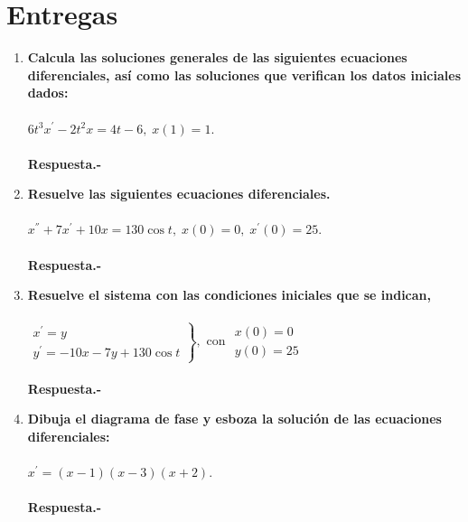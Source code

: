 \section*{\center Entregas}
\vspace{1cm}

\begin{enumerate}[\bfseries 1.]

    \item \textbf{Calcula las soluciones generales de las siguientes ecuaciones diferenciales, así como las soluciones que verifican los datos iniciales dados:}\\\\
	$6t^3x^{'}-2t^2x=4t-6,\; x(1)=1$.\\\\	
	\textbf{Respuesta.-}\; 

    \item \textbf{Resuelve las siguientes ecuaciones diferenciales.}\\\\
	$x^{''}+7x^{'}+10x=130 \cos t, \; x(0)=0,\; x^{'}(0)=25$.\\\\
	\textbf{Respuesta.-}\; 

    \item \textbf{Resuelve el sistema con las condiciones iniciales que se indican,}\\\\
	$\left.\begin{array}{l}x^{'}=y \\ y^{'}=-10x-7y+130\cos t \end{array}\right\},$ con $\begin{array}{l} x(0)=0 \\ y(0)=25 \end{array}$\\\\

	\textbf{Respuesta.-}\; 

    \item \textbf{Dibuja el diagrama de fase y esboza la solución de las ecuaciones diferenciales:}\\\\
	$x^{'}=(x-1)(x-3)(x+2)$.\\\\
	\textbf{Respuesta.-}\; 

\end{enumerate}
